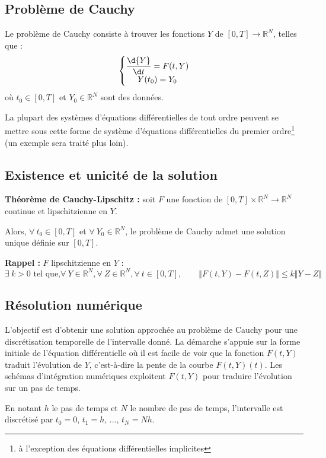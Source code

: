 \documentclass[10pt]{article}
\begin{document}
\subsection{Problème de Cauchy}

Le problème de Cauchy consiste à trouver les fonctions $  {Y}$ de $[0, T] \to \mathbb{R}^N$, telles que :
\[\left\{
\begin{matrix}
\dfrac{\d  {Y}}{\d t} =   {F}(t,  {Y}) \\
  {Y}(t_0)=  {Y_0}
\end{matrix}\right.
\]
où $t_0\in [0, T]$ et $  {Y_0}\in\mathbb{R}^N$ sont des données.

La plupart des systèmes d'équations différentielles de tout ordre peuvent se mettre sous cette forme de système d'équations différentielles du premier ordre\footnote{à l'exception des équations différentielles implicites} (un exemple sera traité plus loin).

\subsection{Existence et unicité de la solution}
\textbf{Théorème de Cauchy-Lipschitz :} soit $  {F}$ une fonction de $[0,T]\times\mathbb{R}^N \to \mathbb{R}^N$ continue et lipschitzienne en $  {Y}$. 

Alors, $\forall~ t_0\in [0, T]$ et $\forall~   {Y_0}\in\mathbb{R}^N$, le problème de Cauchy admet une solution unique définie sur $[0,T]$.


\bigskip
\textbf{Rappel :} $  {F}$ lipschitzienne en $  {Y}$ : 
\[\exists~ k>0\textrm{ tel que,} \forall~   {Y}\in\mathbb{R}^N, \forall~   {Z}\in\mathbb{R}^N, \forall~ t\in[0,T],\qquad \Vert   {F}(t,  {Y})-  {F}(t,  {Z})\Vert \leq k \Vert    {Y}-  {Z} \Vert\]


\subsection{Résolution numérique}
L'objectif est d'obtenir une solution approchée au problème de Cauchy pour une discrétisation temporelle de l'intervalle donné. 
La démarche s'appuie sur la forme initiale de l'équation différentielle où il est facile de voir que la fonction $  {F}(t,  {Y})$ traduit l'évolution de $  {Y}$, c'est-à-dire la pente de la courbe $  {F}(t,  {Y})(t)$. Les schémas d'intégration numériques exploitent $  {F}(t,  {Y})$ pour traduire l'évolution sur un pas de temps.

En notant $h$ le pas de temps et $N$ le nombre de pas de temps, l'intervalle est discrétisé par $t_0=0$, $t_1=h$, ..., $t_N = Nh$.
\end{document}
